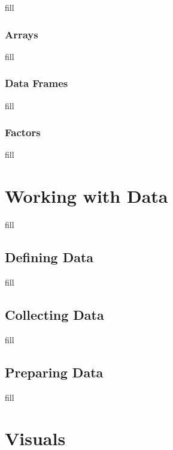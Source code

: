 \documentclass[
  b5paper]{book}
\begin{document}
fill

\hypertarget{arrays}{%
\subsection*{Arrays}\label{arrays}}

fill

\hypertarget{data-frames}{%
\subsection*{Data Frames}\label{data-frames}}

fill

\hypertarget{factors}{%
\subsection*{Factors}\label{factors}}

fill

\hypertarget{working-with-data-1}{%
\chapter{Working with Data}\label{working-with-data-1}}

fill

\hypertarget{defining-data}{%
\section{Defining Data}\label{defining-data}}

fill

\hypertarget{collecting-data}{%
\section{Collecting Data}\label{collecting-data}}

fill

\hypertarget{preparing-data}{%
\section{Preparing Data}\label{preparing-data}}

fill

\hypertarget{visuals-1}{%
\chapter{Visuals}\label{visuals-1}}
\end{document}
